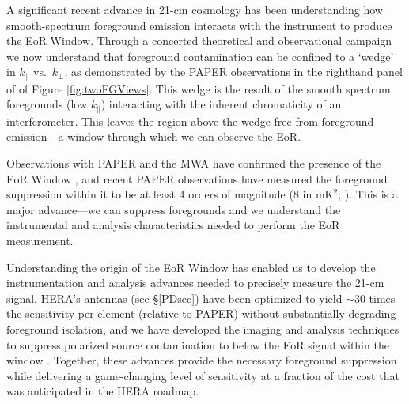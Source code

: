 \documentclass[preprint]{aastex}
\def\kperp{k_{\bot}}
\def\kpar{k_{\|}}
\begin{document}
A significant recent advance in 21-cm cosmology has been understanding how smooth-spectrum
foreground emission interacts with the instrument to produce the EoR Window.
Through a concerted theoretical and observational campaign
\citep{morales_et_al2012,parsons_et_al2012b,vedantham_2012,Datta_2010,hazelton_et_al2013,pober_et_al2013,parsons_et_al2013,dillon_et_al2013b_trunc}
we now understand that foreground contamination can be confined to a `wedge' in
$\kpar$ vs.\ $\kperp$, as demonstrated by the PAPER observations in the
righthand panel of of Figure \ref{fig:twoFGViews}. This wedge is the result of
the smooth spectrum foregrounds 
(low $\kpar$) interacting with the inherent
chromaticity of an interferometer. 
This leaves the region above the wedge free from 
foreground emission---a window through which we can observe the EoR.

Observations with PAPER and the MWA have confirmed the presence of the EoR Window
\citep{pober_et_al2013,dillon_et_al2013b_trunc}, and recent PAPER observations
have measured the foreground suppression within it
to be at least 4 orders of magnitude 
(8 in mK$^2$;
\citealt{parsons_et_al2013}).
This is a major advance---we can
suppress foregrounds and we understand the instrumental and analysis
characteristics needed to perform the EoR measurement.

Understanding the origin of the EoR Window has enabled us to develop the
instrumentation and analysis 
advances needed to precisely measure the 21-cm
signal. HERA's antennas (see \S \ref{PDsec}) have been optimized 
to yield $\sim$30
times the sensitivity per element (relative to PAPER) without substantially degrading
foreground isolation,
and we have developed the imaging and
analysis techniques to suppress polarized source contamination to below the EoR
signal within the window \citep{bernardi_2013_trunc,moore_et_al2013}.
Together, these advances provide the necessary foreground suppression
while delivering a game-changing level of sensitivity at a fraction of the
cost that was anticipated in the HERA roadmap.
\end{document}

